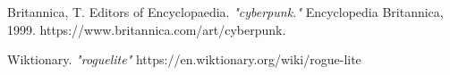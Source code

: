 \documentclass[10pt,conference,onecolumn,compsoc]{IEEEtran}
\begin{document}
\begin{thebibliography}{1}

Britannica, T. Editors of Encyclopaedia. \emph{"cyberpunk."} Encyclopedia Britannica, 		1999. https://www.britannica.com/art/cyberpunk.

Wiktionary. \emph{"roguelite"}
https://en.wiktionary.org/wiki/rogue-lite

\end{thebibliography}







\end{document}
